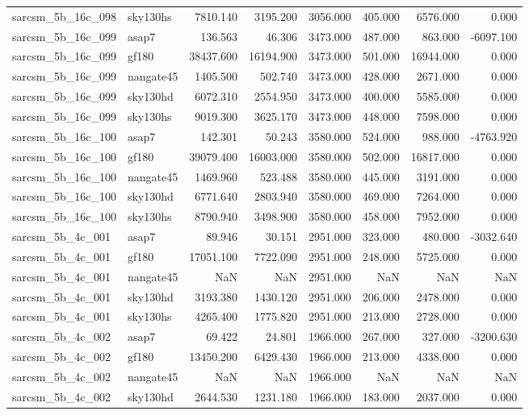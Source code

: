 \begin{tabular}{llrrrrrr}
sarcsm\_5b\_16c\_098 & sky130hs & 7810.140 & 3195.200 & 3056.000 & 405.000 & 6576.000 & 0.000 \\
sarcsm\_5b\_16c\_099 & asap7 & 136.563 & 46.306 & 3473.000 & 487.000 & 863.000 & -6097.100 \\
sarcsm\_5b\_16c\_099 & gf180 & 38437.600 & 16194.900 & 3473.000 & 501.000 & 16944.000 & 0.000 \\
sarcsm\_5b\_16c\_099 & nangate45 & 1405.500 & 502.740 & 3473.000 & 428.000 & 2671.000 & 0.000 \\
sarcsm\_5b\_16c\_099 & sky130hd & 6072.310 & 2554.950 & 3473.000 & 400.000 & 5585.000 & 0.000 \\
sarcsm\_5b\_16c\_099 & sky130hs & 9019.300 & 3625.170 & 3473.000 & 448.000 & 7598.000 & 0.000 \\
sarcsm\_5b\_16c\_100 & asap7 & 142.301 & 50.243 & 3580.000 & 524.000 & 988.000 & -4763.920 \\
sarcsm\_5b\_16c\_100 & gf180 & 39079.400 & 16003.000 & 3580.000 & 502.000 & 16817.000 & 0.000 \\
sarcsm\_5b\_16c\_100 & nangate45 & 1469.960 & 523.488 & 3580.000 & 445.000 & 3191.000 & 0.000 \\
sarcsm\_5b\_16c\_100 & sky130hd & 6771.640 & 2803.940 & 3580.000 & 469.000 & 7264.000 & 0.000 \\
sarcsm\_5b\_16c\_100 & sky130hs & 8790.940 & 3498.900 & 3580.000 & 458.000 & 7952.000 & 0.000 \\
sarcsm\_5b\_4c\_001 & asap7 & 89.946 & 30.151 & 2951.000 & 323.000 & 480.000 & -3032.640 \\
sarcsm\_5b\_4c\_001 & gf180 & 17051.100 & 7722.090 & 2951.000 & 248.000 & 5725.000 & 0.000 \\
sarcsm\_5b\_4c\_001 & nangate45 & NaN & NaN & 2951.000 & NaN & NaN & NaN \\
sarcsm\_5b\_4c\_001 & sky130hd & 3193.380 & 1430.120 & 2951.000 & 206.000 & 2478.000 & 0.000 \\
sarcsm\_5b\_4c\_001 & sky130hs & 4265.400 & 1775.820 & 2951.000 & 213.000 & 2728.000 & 0.000 \\
sarcsm\_5b\_4c\_002 & asap7 & 69.422 & 24.801 & 1966.000 & 267.000 & 327.000 & -3200.630 \\
sarcsm\_5b\_4c\_002 & gf180 & 13450.200 & 6429.430 & 1966.000 & 213.000 & 4338.000 & 0.000 \\
sarcsm\_5b\_4c\_002 & nangate45 & NaN & NaN & 1966.000 & NaN & NaN & NaN \\
sarcsm\_5b\_4c\_002 & sky130hd & 2644.530 & 1231.180 & 1966.000 & 183.000 & 2037.000 & 0.000 \\

\end{tabular}
